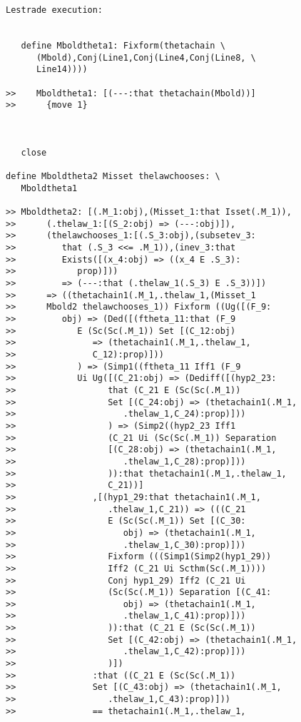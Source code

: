 \documentclass[12pt]{article}
\begin{document}
\begin{verbatim}Lestrade execution:


   define Mboldtheta1: Fixform(thetachain \
      (Mbold),Conj(Line1,Conj(Line4,Conj(Line8, \
      Line14))))

>>    Mboldtheta1: [(---:that thetachain(Mbold))]
>>      {move 1}



   close

define Mboldtheta2 Misset thelawchooses: \
   Mboldtheta1

>> Mboldtheta2: [(.M_1:obj),(Misset_1:that Isset(.M_1)),
>>      (.thelaw_1:[(S_2:obj) => (---:obj)]),
>>      (thelawchooses_1:[(.S_3:obj),(subsetev_3:
>>         that (.S_3 <<= .M_1)),(inev_3:that
>>         Exists([(x_4:obj) => ((x_4 E .S_3):
>>            prop)]))
>>         => (---:that (.thelaw_1(.S_3) E .S_3))])
>>      => ((thetachain1(.M_1,.thelaw_1,(Misset_1
>>      Mbold2 thelawchooses_1)) Fixform ((Ug([(F_9:
>>         obj) => (Ded([(ftheta_11:that (F_9
>>            E (Sc(Sc(.M_1)) Set [(C_12:obj)
>>               => (thetachain1(.M_1,.thelaw_1,
>>               C_12):prop)]))
>>            ) => (Simp1((ftheta_11 Iff1 (F_9
>>            Ui Ug([(C_21:obj) => (Dediff([(hyp2_23:
>>                  that (C_21 E (Sc(Sc(.M_1))
>>                  Set [(C_24:obj) => (thetachain1(.M_1,
>>                     .thelaw_1,C_24):prop)]))
>>                  ) => (Simp2((hyp2_23 Iff1
>>                  (C_21 Ui (Sc(Sc(.M_1)) Separation
>>                  [(C_28:obj) => (thetachain1(.M_1,
>>                     .thelaw_1,C_28):prop)]))
>>                  )):that thetachain1(.M_1,.thelaw_1,
>>                  C_21))]
>>               ,[(hyp1_29:that thetachain1(.M_1,
>>                  .thelaw_1,C_21)) => (((C_21
>>                  E (Sc(Sc(.M_1)) Set [(C_30:
>>                     obj) => (thetachain1(.M_1,
>>                     .thelaw_1,C_30):prop)]))
>>                  Fixform (((Simp1(Simp2(hyp1_29))
>>                  Iff2 (C_21 Ui Scthm(Sc(.M_1))))
>>                  Conj hyp1_29) Iff2 (C_21 Ui
>>                  (Sc(Sc(.M_1)) Separation [(C_41:
>>                     obj) => (thetachain1(.M_1,
>>                     .thelaw_1,C_41):prop)]))
>>                  )):that (C_21 E (Sc(Sc(.M_1))
>>                  Set [(C_42:obj) => (thetachain1(.M_1,
>>                     .thelaw_1,C_42):prop)]))
>>                  )])
>>               :that ((C_21 E (Sc(Sc(.M_1))
>>               Set [(C_43:obj) => (thetachain1(.M_1,
>>                  .thelaw_1,C_43):prop)]))
>>               == thetachain1(.M_1,.thelaw_1,

\end{verbatim}
\end{document}
